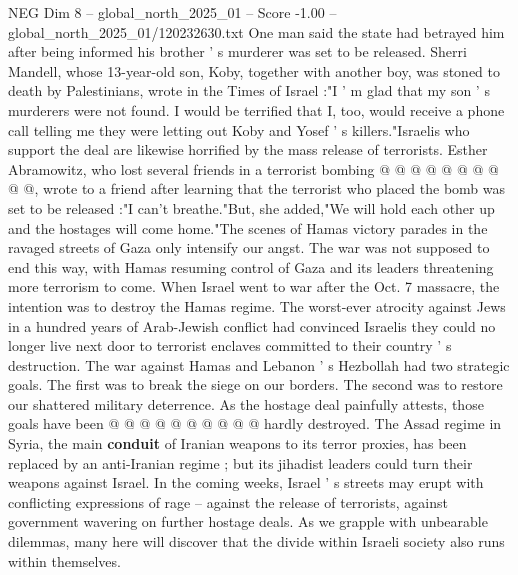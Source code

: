 \begin{textsample}{NEG Dim 8 – global\_north\_2025\_01 – Score -1.00 – global\_north\_2025\_01/120232630.txt}
One man said the state had betrayed him after being informed his brother ' s murderer was set to be released.
Sherri Mandell, whose 13-year-old son, Koby, together with another boy, was stoned to death by Palestinians, wrote in the Times of Israel :"I ' m glad that my son ' s murderers were not found.
I would be terrified that I, too, would receive a phone call telling me they were letting out Koby and Yosef ' s killers."Israelis who support the deal are likewise horrified by the mass release of terrorists.
Esther Abramowitz, who lost several friends in a terrorist bombing @ @ @ @ @ @ @ @ @ @, wrote to a friend after learning that the terrorist who placed the bomb was set to be released :"I can't breathe."But, she added,"We will hold each other up and the hostages will come home."The scenes of Hamas victory parades in the ravaged streets of Gaza only intensify our angst.
The war was not supposed to end this way, with Hamas resuming control of Gaza and its leaders threatening more terrorism to come.
When Israel went to war after the Oct. 7 massacre, the intention was to destroy the Hamas regime.
The worst-ever atrocity against Jews in a hundred years of Arab-Jewish conflict had convinced Israelis they could no longer live next door to terrorist enclaves committed to their country ' s destruction.
The war against Hamas and Lebanon ' s Hezbollah had two strategic goals.
The first was to break the siege on our borders.
The second was to restore our shattered military deterrence.
As the hostage deal painfully attests, those goals have been @ @ @ @ @ @ @ @ @ @ hardly destroyed.
The Assad regime in Syria, the main \textbf{conduit} of Iranian weapons to its terror proxies, has been replaced by an anti-Iranian regime ; but its jihadist leaders could turn their weapons against Israel.
In the coming weeks, Israel ' s streets may erupt with conflicting expressions of rage -- against the release of terrorists, against government wavering on further hostage deals.
As we grapple with unbearable dilemmas, many here will discover that the divide within Israeli society also runs within themselves.

\end{textsample}
